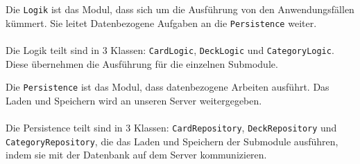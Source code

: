 \documentclass[fontsize=12pt,paper=A4,twoside]{scrartcl}
\begin{document}
    Die \texttt{Logik} ist das Modul, dass sich um die Ausführung von den Anwendungsfällen kümmert.
    Sie leitet Datenbezogene Aufgaben an die \texttt{Persistence} weiter.\\\\
    Die Logik teilt sind in 3 Klassen: \texttt{CardLogic}, \texttt{DeckLogic} und \texttt{CategoryLogic}. Diese übernehmen
    die Ausführung für die einzelnen Submodule.

    Die \texttt{Persistence} ist das Modul, dass datenbezogene Arbeiten ausführt. Das Laden und Speichern wird
    an unseren Server weitergegeben.\\\\
    Die Persistence teilt sind in 3 Klassen: \texttt{CardRepository}, \texttt{DeckRepository} und \texttt{CategoryRepository}, die das Laden und Speichern der
    Submodule ausführen, indem sie mit der Datenbank auf dem Server kommunizieren.
\end{document}
